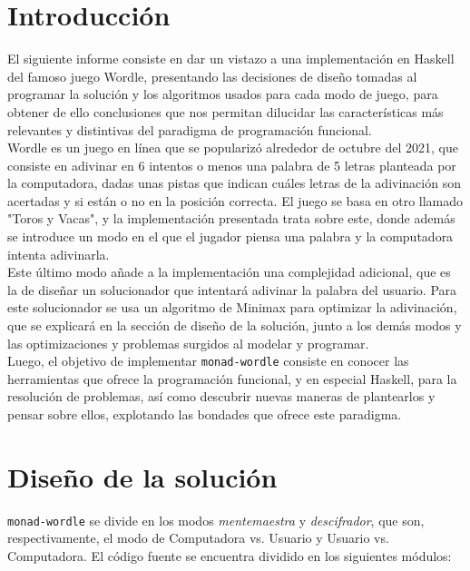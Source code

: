 \documentclass[11pt]{article}
\begin{document}
\newpage

\section{Introducción}


El siguiente informe consiste en dar un vistazo a una implementación en Haskell
del famoso juego Wordle, presentando las decisiones de diseño tomadas al 
programar la solución y los algoritmos usados para cada modo de juego, para obtener
de ello conclusiones que nos permitan dilucidar las características más relevantes
y distintivas del paradigma de programación funcional. \\

Wordle es un juego en línea que se popularizó alrededor de octubre del 2021, que
consiste en adivinar en 6 intentos o menos una palabra de 5 letras planteada por
la computadora, dadas unas pistas que indican cuáles letras de la adivinación son
acertadas y si están o no en la posición correcta. El juego se basa en otro llamado
"Toros y Vacas", y la implementación presentada trata sobre este, donde además se
introduce un modo en el que el jugador piensa una palabra y la computadora intenta
adivinarla. \\

Este último modo añade a la implementación una complejidad adicional, que es la de
diseñar un solucionador que intentará adivinar la palabra del usuario. Para este
solucionador se usa un algoritmo de Minimax para optimizar la adivinación, que se
explicará en la sección de diseño de la solución, junto a los demás modos y las
optimizaciones y problemas surgidos al modelar y programar. \\

Luego, el objetivo de implementar \texttt{monad-wordle} consiste en conocer las
herramientas que ofrece la programación funcional, y en especial Haskell, para
la resolución de problemas, así como descubrir nuevas maneras de plantearlos y pensar
sobre ellos, explotando las bondades que ofrece este paradigma.

\section{Diseño de la solución}

\texttt{monad-wordle} se divide en los modos \emph{mentemaestra} y \emph{descifrador},
que son, respectivamente, el modo de Computadora vs. Usuario y Usuario vs. Computadora.
El código fuente se encuentra dividido en los siguientes módulos:
\end{document}

